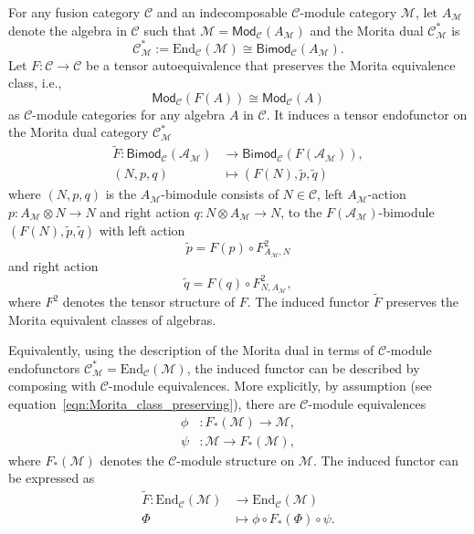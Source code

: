 \documentclass[aps,twocolumn,prx,floatfix,preprintnumbers, nofootinbib,10pt]{revtex4-2}
\numberwithin{equation}{section}
\theoremstyle{definition}
\newcommand{\be}{\begin{equation}}
\newcommand{\ee}{\end{equation}}
\newcommand{\wt}{\widetilde}
\newcommand{\ot}{\otimes}
\newcommand{\cA}{\mathcal{A}}
\newcommand{\cC}{\mathcal{C}}
\newcommand{\cM}{\mathcal{M}}
\newcommand{\End}{\text{End}}
\newcommand{\Mod}{\mathsf{Mod}}
\newcommand{\Bimod}{\mathsf{Bimod}}
\begin{document}
For any fusion category $\cC$ and an indecomposable $\cC$-module category $\cM$, let $A_\cM$ denote the algebra in $\cC$ such that $\cM=\Mod_\cC(A_\cM)$ and the Morita dual $\cC_\cM^*$ is 
\be
    \cC_\cM^* :=\End_\cC(\cM) \cong \Bimod_\cC(A_\cM).
\ee
Let $F: \cC \rightarrow \cC$ be a tensor autoequivalence that preserves the Morita equivalence class, i.e., 
\be
\label{eqn:Morita_class_preserving}
    \Mod_\cC(F(A)) \cong \Mod_\cC(A)
\ee 
as $\cC$-module categories for any algebra $A$ in $\cC$. 
It induces a tensor endofunctor on the Morita dual category $\cC_{\cM}^*$
\begin{equation}
    \begin{split}
        \wt{F}: \Bimod_{\cC}(\cA_{\cM}) & \rightarrow \Bimod_{\cC}(F(\cA_{\cM})), \\
        (N,p,q) & \mapsto (F(N), \wt{p}, \wt{q})
    \end{split}
\end{equation}
where $(N,p,q)$ is the $A_\cM$-bimodule consists of $N \in \cC$, left $A_\cM$-action $p:A_\cM \ot N \rightarrow N$ and right action $q:N \otimes A_\cM\rightarrow N$, to the $F(\cA_{\cM})$-bimodule $(F(N), \wt{p}, \wt{q})$ with left action
\be
    \wt{p} = F(p) \circ F^2_{A_\cM, N}
\ee
and right action
\be
    \wt{q} = F(q) \circ F^2_{N,A_\cM},
\ee
where $F^2$ denotes the tensor structure of $F$. The induced functor $\wt{F}$ preserves the Morita equivalent classes of algebras.

Equivalently, using the description of the Morita dual in terms of $\cC$-module endofunctors $\cC_\cM^* = \End_{\cC}(\cM)$, the induced functor can be described by composing with $\cC$-module equivalences. More explicitly, by assumption (see equation~\eqref{eqn:Morita_class_preserving}), there are $\cC$-module equivalences
\begin{align}
    \phi& : F_*(\cM) \rightarrow \cM,\\
    \psi& : \cM \rightarrow F_*(\cM),
\end{align}
where $F_*(\cM)$ denotes the $\cC$-module structure on $\cM$. The induced functor can be expressed as
\begin{equation}
    \begin{split}
        \wt{F}: \End_\cC(\cM) & \rightarrow \End_\cC(\cM)\\
    \Phi & \mapsto \phi \circ F_*(\Phi) \circ \psi. \label{eqn:induced_functor_module_endof}
    \end{split}
\end{equation}
\end{document}

